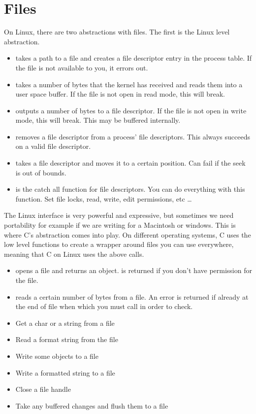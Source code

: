 \section{Files}

On Linux, there are two abstractions with files. The first is the Linux  level abstraction.

 \begin{itemize}
\item {} takes a path to a file and creates a file descriptor entry in the process table. If the file is not available to you, it errors out.
\item {} takes a number of bytes that the kernel has received and reads them into a user space buffer. If the file is not open in read mode, this will break.
\item {} outputs a number of bytes to a file descriptor. If the file is not open in write mode, this will break. This may be buffered internally.
\item {} removes a file descriptor from a process' file descriptors. This always succeeds on a valid file descriptor.
\item {} takes a file descriptor and moves it to a certain position. Can fail if the seek is out of bounds.
\item {} is the catch all function for file descriptors. You can do everything with this function. Set file locks, read, write, edit permissions, etc \ldots{}
 \end{itemize}

The Linux interface is very powerful and expressive, but sometimes we need portability for example if we are writing for a Macintosh or windows.
This is where C's abstraction comes into play.
On different operating systems, C uses the low level functions to create a wrapper around files you can use everywhere, meaning that C on Linux uses the above calls.

\begin{itemize}
\item {} opens a file and returns an object.  is returned if you don't have permission for the file.
\item {} reads a certain number of bytes from a file. An error is returned if already at the end of file when which you must call  in order to check.
\item {} Get a char or a string from a file
\item {} Read a format string from the file
\item {} Write some objects to a file
\item {} Write a formatted string to a file
\item {} Close a file handle
\item {} Take any buffered changes and flush them to a file
\end{itemize}

